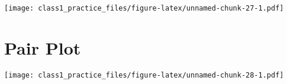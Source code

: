 \documentclass[
]{article}
\newenvironment{Shaded}{\begin{snugshade}}{\end{snugshade}}
\newcommand{\AttributeTok}[1]{\textcolor[rgb]{0.13,0.29,0.53}{#1}}
\newcommand{\DecValTok}[1]{\textcolor[rgb]{0.00,0.00,0.81}{#1}}
\newcommand{\FunctionTok}[1]{\textcolor[rgb]{0.13,0.29,0.53}{\textbf{#1}}}
\newcommand{\NormalTok}[1]{#1}
\newcommand{\OtherTok}[1]{\textcolor[rgb]{0.56,0.35,0.01}{#1}}
\newcommand{\SpecialCharTok}[1]{\textcolor[rgb]{0.81,0.36,0.00}{\textbf{#1}}}
\begin{document}
\texttt{[image: class1\_practice\_files/figure-latex/unnamed-chunk-27-1.pdf]}

\hypertarget{pair-plot}{%
\section{Pair Plot}\label{pair-plot}}

\begin{Shaded}
\end{Shaded}

\texttt{[image: class1\_practice\_files/figure-latex/unnamed-chunk-28-1.pdf]}
\end{document}
